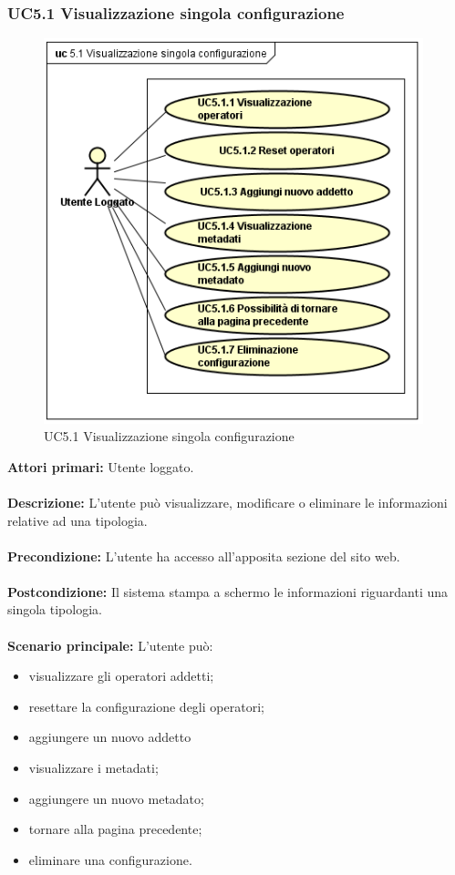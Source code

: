 \subsubsection{UC5.1 Visualizzazione singola configurazione}
    \label{UC5.1}
    \begin{figure}[!h] 
        \centering 
        \includegraphics[width = 11cm]{immagini/UseCase/dettaglioconfig.png}
        \caption{UC5.1 Visualizzazione singola configurazione}
    \end{figure}
    
    \textbf{Attori primari:} Utente loggato.
    \\ 
    \\
    \textbf{Descrizione:} L'utente può visualizzare, modificare o eliminare le informazioni relative ad una tipologia.
    \\
    \\
    \textbf{Precondizione:} L'utente ha accesso all'apposita sezione del sito web.
    \\
    \\
    \textbf{Postcondizione:} Il sistema stampa a schermo le informazioni riguardanti una singola tipologia.
    \\
    \\
    \textbf{Scenario principale:} L'utente può:
            \begin{itemize}
                \item visualizzare gli operatori addetti;
                \item resettare la configurazione degli operatori;
                \item aggiungere un nuovo addetto
                \item visualizzare i metadati;
                \item aggiungere un nuovo metadato;
                \item tornare alla pagina precedente;
                \item eliminare una configurazione.
            \end{itemize}
\newpage
